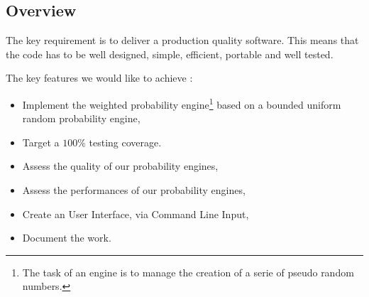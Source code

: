 \documentclass[12pt,a4paper,titlepage]{article}
\begin{document}
\subsection{Overview}

The key requirement is to deliver a production quality software.
This means that the code has to be well designed, simple, 
efficient, portable and well tested.

The key features we would like to achieve :
\begin{itemize}
	\item Implement the weighted probability engine\footnote{
		The task of an engine is to manage the creation of a serie of
		pseudo random numbers.} based
		on a bounded uniform random probability engine,
	\item Target a $100\%$ testing coverage.
	\item Assess the quality of our probability engines,
	\item Assess the performances of our probability engines,
	\item Create an User Interface, via Command Line Input,
	\item Document the work.
\end{itemize}
\end{document}
